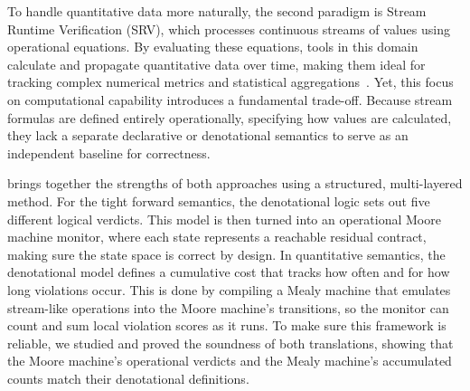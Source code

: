 To handle quantitative data more naturally, the second paradigm is Stream Runtime Verification (SRV), which processes continuous streams of values using operational equations. By evaluating these equations, tools in this domain calculate and propagate quantitative data over time, making them ideal for tracking complex numerical metrics and statistical aggregations~\cite{sanchez2018online,gorostiaga2018striver,gorostiaga2021hlola,tessla2015language,Scheffel2022,Schmitz2024Efficient}. Yet, this focus on computational capability introduces a fundamental trade-off. Because stream formulas are defined entirely operationally, specifying how values are calculated, they lack a separate declarative or denotational semantics to serve as an independent baseline for correctness.

\cDL brings together the strengths of both approaches using a structured, multi-layered method. For the tight forward semantics, the denotational logic sets out five different logical verdicts. This model is then turned into an operational Moore machine monitor, where each state represents a reachable residual contract, making sure the state space is correct by design. In quantitative semantics, the denotational model defines a cumulative cost that tracks how often and for how long violations occur. This is done by compiling a Mealy machine that emulates stream-like operations into the Moore machine's transitions, so the monitor can count and sum local violation scores as it runs. To make sure this framework is reliable, we studied and proved the soundness of both translations, showing that the Moore machine's operational verdicts and the Mealy machine's accumulated counts match their denotational definitions.


